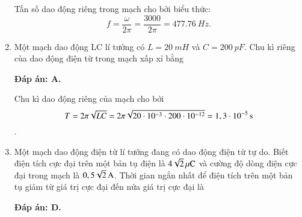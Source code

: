 \begin{enumerate}[label=\bfseries Câu \arabic*:]
{		Tần số dao động riêng trong mạch cho bởi biểu thức:
		$$
		f=\dfrac{\omega}{2 \pi}=\dfrac{3000}{2 \pi}= \SI{477,76}{Hz}.
		$$
		
	}
	
	\item {}
	
	{Một mạch dao động LC lí tưởng có $L = \SI{20}{mH}$ và $C = \SI{200}{pF}$. Chu kì riêng của dao động điện từ trong mạch xấp xỉ bằng
	}
	
	\hideall
	{		\textbf{Đáp án: A.}
		
		Chu kì dao động riêng của mạch cho bởi 
		$$ T = 2\pi \sqrt{LC} = 2\pi \sqrt{20\cdot10^{-3} \cdot 200\cdot10^{-12}} = \xsi{1,3\cdot10^{-5}}{s} $$.
		
	}
	
	\item {}
	
	{Một mạch dao động điện từ lí tưởng đang có dao động điện từ tự do. Biết điện tích cực đại trên một bản tụ điện là $\xsi{4\sqrt{2}}{\mu C}$ và cường độ dòng điện cực đại trong mạch là $\xsi{0,5\sqrt{2}}{A}$. Thời gian ngắn nhất để điện tích trên một bản tụ giảm từ giá trị cực đại đến nửa giá trị cực đại là
	}
	
	\hideall
	{		\textbf{Đáp án: D.}
		
}
\end{enumerate}
